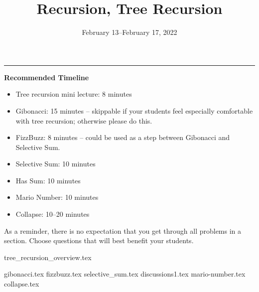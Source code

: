 \documentclass{exam}
\title{Recursion, Tree Recursion}
\date{February 13--February 17, 2022}
\begin{document}
\maketitle
\rule{\textwidth}{0.15em}
\fontsize{12}{15}\selectfont

\begin{meta}
\textbf{Recommended Timeline}
\begin{itemize}
    \item Tree recursion mini lecture: 8 minutes
    \item Gibonacci: 15 minutes -- skippable if your students feel especially comfortable with tree recursion; otherwise please do this.
    \item FizzBuzz: 8 minutes -- could be used as a step between Gibonacci and Selective Sum.
    \item Selective Sum: 10 minutes
    \item Has Sum: 10 minutes
    \item Mario Number: 10 minutes
    \item Collapse: 10--20 minutes
\end{itemize}
As a reminder, there is no expectation that you get through all problems in a section. Choose questions that will best benefit your students.
\end{meta}

{tree_recursion_overview.tex}
\begin{questions}
    {gibonacci.tex}
    {fizzbuzz.tex}
    {selective_sum.tex}
    {discussions1.tex} 
    {mario-number.tex}
    {collapse.tex}
\end{questions}
\end{document}
